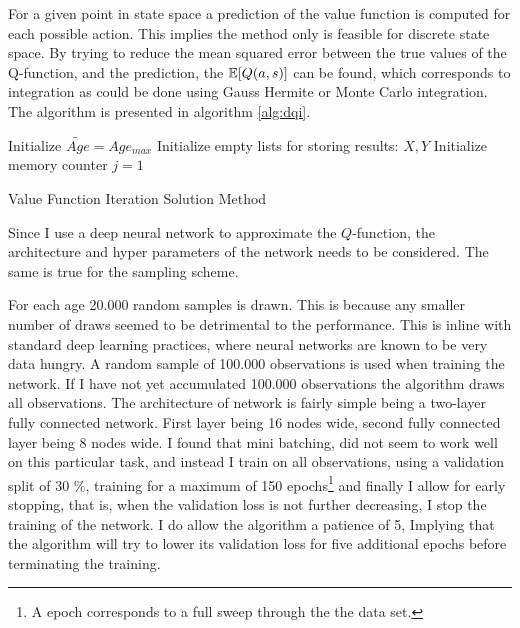 For a given point in state space a prediction of the value function is computed for each possible action. This implies the method only is feasible for discrete state space. By trying to reduce the mean squared error between the true values of the Q-function, and the prediction, the $\mathbb{E}[Q(a, s)]$ can be found, which corresponds to integration as could be done using Gauss Hermite or Monte Carlo integration. The algorithm is presented in algorithm \ref{alg:dqi}.

\begin{algorithm}[H]
\SetAlgoLined
{}
 Initialize $\tilde{Age} = Age_{max}$\;
 Initialize empty lists for storing results: $X, Y$\;
 Initialize memory counter $j=1$\;
 \caption{Value Function Iteration Solution Method}
 \label{alg:dqi}
 \end{algorithm}

Since I use a deep neural network to approximate the $Q$-function, the architecture and hyper parameters of the network needs to be considered. The same is true for the sampling scheme.

For each age 20.000 random samples is drawn. This is because any smaller number of draws seemed to be detrimental to the performance. This is inline with standard deep learning practices, where neural networks are known to be very data hungry. A random sample of 100.000 observations is used when training the network. If I have not yet accumulated 100.000 observations the algorithm draws all observations. The architecture of network is fairly simple being a two-layer fully connected network. First layer being 16 nodes wide, second fully connected layer being 8 nodes wide. I found that mini batching, did not seem to work well on this particular task, and instead I train on all observations, using a validation split of 30 \%, training for a maximum of 150 epochs\footnote{A epoch corresponds to a full sweep through the the data set.} and finally I allow for early stopping, that is, when the validation loss is not further decreasing, I stop the training of the network. I do allow the algorithm a patience of 5, Implying that the algorithm will try to lower its validation loss for five additional epochs before terminating the training.


